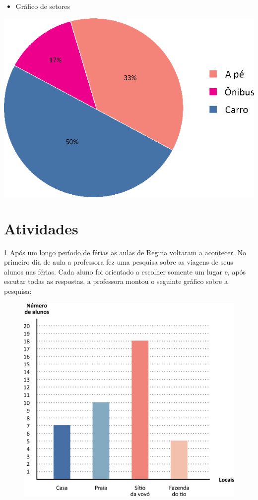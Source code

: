 {\pagebreak
\begin{itemize}
\item
  Gráfico de setores
\end{itemize}

\includegraphics[width=\textwidth]{./media/image78.png}
}

\section*{Atividades}

\num{1} Após um longo período de férias as aulas de Regina voltaram a acontecer.
No primeiro dia de aula a professora fez uma pesquisa sobre as viagens de seus alunos nas férias. Cada aluno foi
orientado a escolher somente um lugar e, após escutar todas as respostas,
a professora montou o seguinte gráfico sobre a pesquisa:

\begin{figure}[htpb!]
\centering
\includegraphics[width=\textwidth]{./media/image79.png}
\end{figure}

